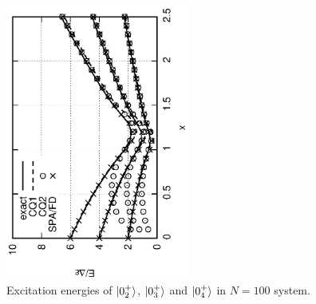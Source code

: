 \documentclass[%
superscriptaddress,
preprint,
showpacs,
nofootinbib,
amsmath,amssymb,
prc,
floatfix ]%
{revtex4-1}
\begin{document}
\begin{figure}[htbp]
 \begin{center}
  \includegraphics[width=60mm,angle=-90]{images/N100ex_energy2.eps}
 \end{center}
 \caption{Excitation energies of $\ket{0_2^+}$, $\ket{0_3^+}$ and $\ket{0_4^+}$ in $N=100$ system.}
 \label{fig:N100energy}
\end{figure}
\end{document}
